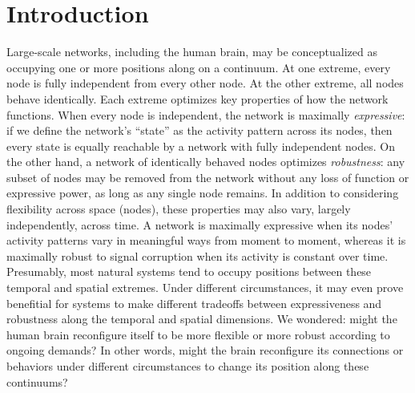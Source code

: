 \documentclass[english, 11pt]{article}
\begin{document}
\doublespacing

\section*{Introduction}

Large-scale networks, including the human brain, may be conceptualized as
occupying one or more positions along on a continuum. At one extreme, every
node is fully independent from every other node. At the other extreme, all
nodes behave identically. Each extreme optimizes key properties of how the
network functions. When every node is independent, the network is maximally
\textit{expressive}: if we define the network's ``state'' as the activity
pattern across its nodes, then every state is equally reachable by a network
with fully independent nodes. On the other hand, a network of identically
behaved nodes optimizes \textit{robustness}: any subset of nodes may be removed
from the network without any loss of function or expressive power, as long as
any single node remains. In addition to considering flexibility across space
(nodes), these properties may also vary, largely independently, across time. A
network is maximally expressive when its nodes' activity patterns vary in
meaningful ways from moment to moment, whereas it is maximally robust to signal
corruption when its activity is constant over time. Presumably, most natural
systems tend to occupy positions between these temporal and spatial extremes. Under
different circumstances, it may even prove benefitial for systems to make
different tradeoffs between expressiveness and robustness along the temporal
and spatial dimensions.  We wondered: might the human brain reconfigure itself to
be more flexible or more robust according to ongoing demands? In other words,
might the brain reconfigure its connections or behaviors under different
circumstances to change its position along these continuums?
\end{document}
